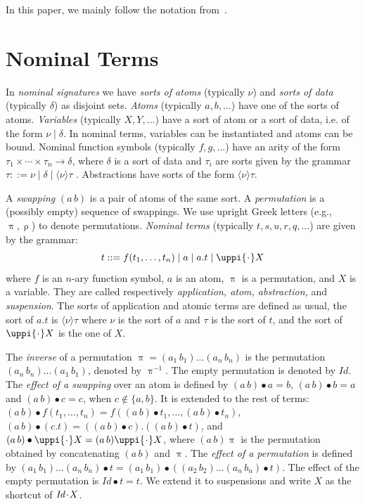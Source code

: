 \documentclass[11pt,a4paper]{amsart}
\theoremstyle{definition}
\newcommand{\id}{\mathit{Id}}
\newcommand{\swap}[2]{\ensuremath{(#1\, #2)}}
\newcommand{\idp}{\mathit{Id}}
\newcommand{\permap}{{\mkern 1mu\cdot \mkern 1mu}}
\newcommand{\permef}{\bullet}
\newcommand\ppi{\uppi}
\newcommand\prho{\uprho}
\begin{document}
In this paper, we mainly follow the notation
from~\cite{DBLP:journals/tocl/LevyV12}.




\section{Nominal Terms}
\label{sect:nominal}
In \emph{nominal signatures}
we have \emph{sorts of atoms} (typically $\nu$) and \emph{sorts of
  data} (typically $\delta$) as disjoint sets. \emph{Atoms} (typically
$a, b, \ldots$) have one of the sorts of atoms. \emph{Variables}
(typically $ X, Y, \ldots$) have a sort of atom or a sort of data,
i.e. of the form $\nu \mid \delta$. In nominal terms, variables can
be instantiated and atoms can be bound. Nominal function symbols
(typically $ f, g, \ldots$) have an arity of the form $\tau_1 \times
\cdots\times \tau_n \rightarrow \delta$, where $\delta$ is a sort of
data and $\tau_i$ are sorts given by the grammar $\tau ::= \nu \mid
\delta \mid \langle \nu\rangle \tau$ . Abstractions have sorts of the
form $\langle \nu\rangle \tau.$ 


A \emph{swapping} $\swap{a}{b}$ is a pair of atoms of the same
sort. A \emph{permutation} is a (possibly empty) sequence of swappings. We use upright Greek letters (e.g., $\ppi, \prho$) to denote permutations.
\emph{Nominal terms} (typically $ t, s, u, r, q, \ldots$) are given by the
grammar:
\[ t ::=  f(t_1 , \ldots , t_n ) \mid a \mid a.t \mid \ppi \permap  X\]
where $ f$ is an $n$-ary function symbol, $a$ is an atom, $\ppi$ is a
permutation, and $ X$ is a variable. They are called respectively
\emph{application, atom, abstraction,} and \emph{suspension}. The
sorts of application and atomic terms are defined as usual, the sort
of $a.t$ is $\langle \nu\rangle \tau$ where $\nu$ is the sort of $a$
and $\tau$ is the sort of $t$, and the sort of $\ppi \permap X$ is the
one of $X$.


The \emph{inverse} of a permutation $\ppi=\swap{a_1}{b_1} \ldots \swap{a_n}{b_n}$ is the permutation $\swap{a_n}{b_n} \ldots \swap{a_1}{b_1}$, denoted by $\ppi^{-1}$. The empty permutation is denoted by $\idp$. 
The \emph{effect of a swapping} over an atom is defined by
$\swap{a}{b} \permef a = b$, $\swap{a}{b}\permef b = a$ and
$\swap{a}{b}\permef c = c$, when $c \notin \{a, b\}$. It is extended
to the rest of terms: $\swap{a}{b}\permef f(t_1,\ldots,t_n) =
f(\swap{a}{b}\permef t_1,\ldots,\swap{a}{b}\permef t_n)$,
$\swap{a}{b}\permef (c.t) = \left ( \swap{a}{b}\permef c \right
).\left (\swap{a}{b} \permef t \right ) $, and $\swap{a}{b}\permef
\ppi \permap X = \swap{a}{b}\ppi \permap X$, where $\swap{a}{b}\ppi$
is the permutation obtained by concatenating $\swap{a}{b}$ and
$\ppi$. The \emph{effect of a permutation} is defined by
$\swap{a_1}{b_1} \ldots \swap{a_n}{b_n}\permef t =
\swap{a_1}{b_1}\permef \left (\swap{a_2}{b_2} \ldots
\swap{a_n}{b_n}\permef t\right )$. The effect of the empty permutation
is $\idp\permef t = t$. We extend it to suspensions and write $X$ as
the shortcut of $\id\permap X$.
\end{document}
